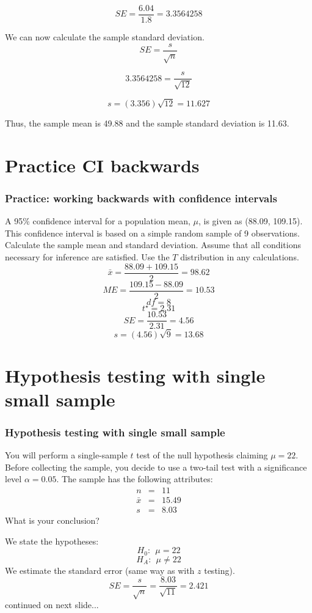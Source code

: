 \documentclass[slidestop,compress,mathserif]{beamer}
\newcommand{\soln}[1]{\textit{#1}}
\begin{document}
\begin{frame}
\[SE = \frac{6.04}{1.8} = 3.3564258 \]

\pause
We can now calculate the sample standard deviation.
\[SE = \frac{s}{\sqrt{n}} \]

\pause
\[3.3564258 = \frac{s}{\sqrt{12}} \]

\pause
\[s = (3.356)\sqrt{12} = 11.627 \]

\pause
Thus, the sample mean is 49.88 and the sample standard deviation is
11.63.
\end{frame}


\section{Practice CI backwards}

\begin{frame}
\frametitle{Practice: working backwards with confidence intervals}
A 95\% confidence interval for a population mean, \(\mu\), is given as
(88.09, 109.15). This confidence interval is based on a simple random
sample of 9 observations. Calculate the sample mean and standard
deviation. Assume that all conditions necessary for inference are
satisfied. Use the \(T\) distribution in any calculations.
\pause
\soln{
$$\bar{x} = \frac{88.09 + 109.15}{2} = 98.62 $$
\pause
$$ME = \frac{109.15-88.09}{2} = 10.53 $$
\pause
$$df=8 $$
\pause \vspace{-5pt}
$$t^{\star} = 2.31 $$
\pause \vspace{-5pt}
$$SE = \frac{10.53}{2.31} = 4.56 $$
\pause \vspace{-5pt}
$$s = (4.56)\sqrt{9} = 13.68 $$
 }
\end{frame}



\section{Hypothesis testing with single small sample}

\begin{frame}
\frametitle{Hypothesis testing with single small sample}
You will perform a single-sample \(t\) test of the null hypothesis
claiming \(\mu=22\). Before collecting the sample, you decide to use a
two-tail test with a significance level \(\alpha = 0.05\). The sample
has the following attributes: \[\begin{aligned}
n &=& 11 \\
\bar{x} &=& 15.49 \\
s &=& 8.03
\end{aligned}\] What is your conclusion?

\pause 
We state the hypotheses:\pause \[H_0:~~\mu = 22 \] \[H_A:~~\mu \ne 22 \] 
\pause
We estimate the standard error (same way as with \(z\) testing). \pause
\[SE = \frac{s}{\sqrt{n}} =  \frac{8.03}{\sqrt{11}} = 2.421\]
continued on next slide...
\end{frame}
\end{document}
